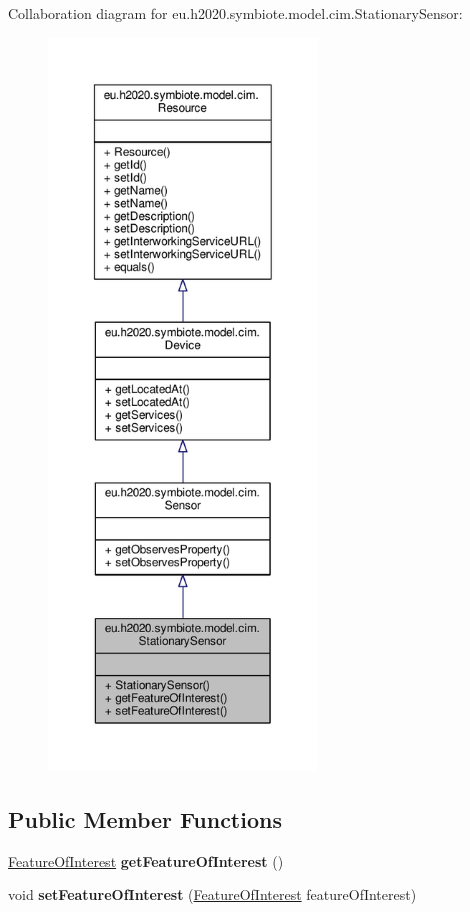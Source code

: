Collaboration diagram for eu.\+h2020.\+symbiote.\+model.\+cim.\+Stationary\+Sensor\+:
\nopagebreak
\begin{figure}[H]
\begin{center}
\leavevmode
\includegraphics[height=550pt]{classeu_1_1h2020_1_1symbiote_1_1model_1_1cim_1_1StationarySensor__coll__graph}
\end{center}
\end{figure}
\subsection*{Public Member Functions}
\begin{DoxyCompactItemize}
\item 
\mbox{\label{classeu_1_1h2020_1_1symbiote_1_1model_1_1cim_1_1StationarySensor_a34cdddb44487e475bf7e8e0b303fddc0}} 
\hyperlink{classeu_1_1h2020_1_1symbiote_1_1model_1_1cim_1_1FeatureOfInterest}{Feature\+Of\+Interest} {\bfseries get\+Feature\+Of\+Interest} ()
\item 
\mbox{\label{classeu_1_1h2020_1_1symbiote_1_1model_1_1cim_1_1StationarySensor_ae0df134d7af18cd1e2d97da3ea3c2470}} 
void {\bfseries set\+Feature\+Of\+Interest} (\hyperlink{classeu_1_1h2020_1_1symbiote_1_1model_1_1cim_1_1FeatureOfInterest}{Feature\+Of\+Interest} feature\+Of\+Interest)
\end{DoxyCompactItemize}


